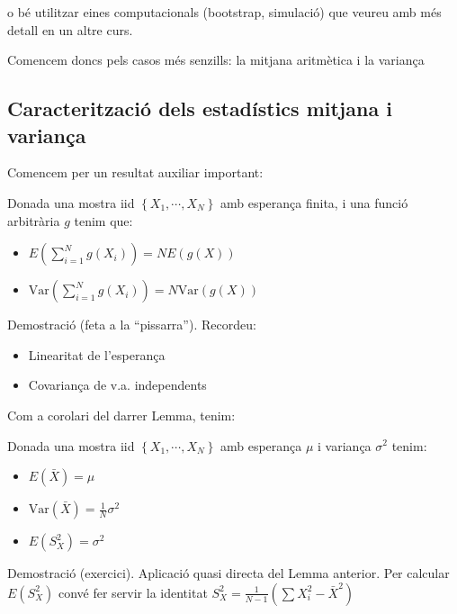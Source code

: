 \documentclass[letterpaper,10pt,english]{sphinxmanual}
\begin{document}
o bé utilitzar eines computacionals (bootstrap, simulació) que veureu amb més detall en un altre curs.

Comencem doncs pels casos més senzills: la mitjana aritmètica i la variança


\subsection{Caracterització dels estadístics mitjana i variança}
\label{\detokenize{0_Intro/0_2_Intro_stats:caracteritzacio-dels-estadistics-mitjana-i-varianca}}
Comencem per un resultat auxiliar important:

 Donada una mostra iid \(\left\{X_1, \cdots, X_N\right\}\) amb esperança finita, i una funció
arbitrària \(g\) tenim que:
\begin{itemize}
\item {} 
\(E\left(\sum_{i=1}^N g\left(X_i\right)\right) = N E\left(g\left(X\right)\right)\)

\item {} 
\(\mbox{Var}\left(\sum_{i=1}^N g\left(X_i\right)\right) = N \mbox{Var}\left(g\left(X\right)\right)\)

\end{itemize}

Demostració (feta a la “pissarra”). Recordeu:
\begin{itemize}
\item {} 
Linearitat de l’esperança

\item {} 
Covariança de v.a. independents

\end{itemize}

Com a corolari del darrer Lemma, tenim:

 Donada una mostra iid \(\left\{X_1, \cdots, X_N\right\}\) amb esperança \(\mu\) i variança \(\sigma^2\)
tenim:
\begin{itemize}
\item {} 
\(E\left(\bar{X}\right) = \mu\)

\item {} 
\(\mbox{Var}\left(\bar{X}\right) = \frac{1}{N}\sigma^2\)

\item {} 
\(E\left(S^2_X\right) = \sigma^2\)

\end{itemize}

Demostració (exercici). Aplicació quasi directa del Lemma anterior. Per calcular
\(E\left(S^2_X\right)\) convé fer servir la identitat \(S^2_X = \frac{1}{N -1}(\sum X_i^2 - \bar{X}^2)\)
\end{document}
